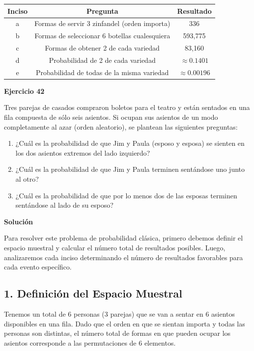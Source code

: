 \documentclass[a4paper]{article}
\begin{document}
\begin{center}
\begin{tabular}{|c|c|c|}
\hline
\textbf{Inciso} & \textbf{Pregunta} & \textbf{Resultado} \\
\hline
a & Formas de servir 3 zinfandel (orden importa) & 336 \\
\hline
b & Formas de seleccionar 6 botellas cualesquiera & 593,775 \\
\hline
c & Formas de obtener 2 de cada variedad & 83,160 \\
\hline
d & Probabilidad de 2 de cada variedad & $\approx 0.1401$ \\
\hline
e & Probabilidad de todas de la misma variedad & $\approx 0.00196$ \\
\hline
\end{tabular}
\end{center}


\textbf{Ejercicio 42}

Tres parejas de casados compraron boletos para el teatro y están sentados en una fila compuesta de sólo seis asientos. Si ocupan sus asientos de un modo completamente al azar (orden aleatorio), se plantean las siguientes preguntas:

\begin{enumerate}
    \item ¿Cuál es la probabilidad de que Jim y Paula (esposo y esposa) se sienten en los dos asientos extremos del lado izquierdo?
    \item ¿Cuál es la probabilidad de que Jim y Paula terminen sentándose uno junto al otro?
    \item ¿Cuál es la probabilidad de que por lo menos dos de las esposas terminen sentándose al lado de su esposo?
\end{enumerate}

\vspace{0.5cm}

\textbf{Solución}

Para resolver este problema de probabilidad clásica, primero debemos definir el espacio muestral y calcular el número total de resultados posibles. Luego, analizaremos cada inciso determinando el número de resultados favorables para cada evento específico.

\subsection*{1. Definición del Espacio Muestral}

Tenemos un total de 6 personas (3 parejas) que se van a sentar en 6 asientos disponibles en una fila. Dado que el orden en que se sientan importa y todas las personas son distintas, el número total de formas en que pueden ocupar los asientos corresponde a las permutaciones de 6 elementos.
\end{document}

